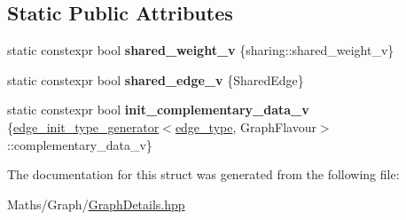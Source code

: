 \subsection*{Static Public Attributes}
\begin{DoxyCompactItemize}
\item 
\mbox{\label{structsequoia_1_1maths_1_1graph__impl_1_1edge__type__generator_a90343c83269941464499ec03d79818f5}} 
static constexpr bool {\bfseries shared\+\_\+weight\+\_\+v} \{sharing\+::shared\+\_\+weight\+\_\+v\}
\item 
\mbox{\label{structsequoia_1_1maths_1_1graph__impl_1_1edge__type__generator_a65b50dda79073fe2f68e0e3f3c664ca7}} 
static constexpr bool {\bfseries shared\+\_\+edge\+\_\+v} \{Shared\+Edge\}
\item 
\mbox{\label{structsequoia_1_1maths_1_1graph__impl_1_1edge__type__generator_a82ca280f4558aa810b4449e9e913fc0d}} 
static constexpr bool {\bfseries init\+\_\+complementary\+\_\+data\+\_\+v} \{\mbox{\hyperlink{structsequoia_1_1maths_1_1graph__impl_1_1edge__init__type__generator}{edge\+\_\+init\+\_\+type\+\_\+generator}}$<$\mbox{\hyperlink{classsequoia_1_1maths_1_1partial__edge}{edge\+\_\+type}}, Graph\+Flavour$>$\+::complementary\+\_\+data\+\_\+v\}
\end{DoxyCompactItemize}


The documentation for this struct was generated from the following file\+:\begin{DoxyCompactItemize}
\item 
Maths/\+Graph/\mbox{\hyperlink{_graph_details_8hpp}{Graph\+Details.\+hpp}}\end{DoxyCompactItemize}
